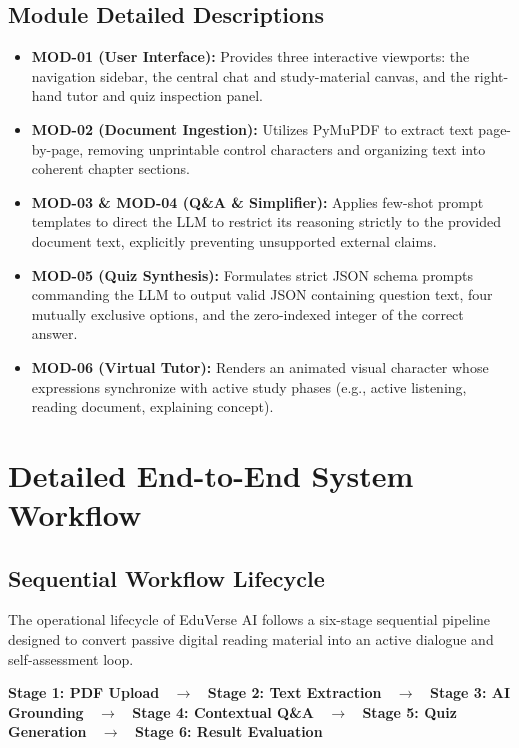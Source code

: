 \documentclass[11pt,a4paper]{report}
\begin{document}
\section{Module Detailed Descriptions}
\begin{itemize}[noitemsep, topsep=2pt]
    \item \textbf{MOD-01 (User Interface):} Provides three interactive viewports: the navigation sidebar, the central chat and study-material canvas, and the right-hand tutor and quiz inspection panel.
    \item \textbf{MOD-02 (Document Ingestion):} Utilizes PyMuPDF to extract text page-by-page, removing unprintable control characters and organizing text into coherent chapter sections.
    \item \textbf{MOD-03 \& MOD-04 (Q\&A \& Simplifier):} Applies few-shot prompt templates to direct the LLM to restrict its reasoning strictly to the provided document text, explicitly preventing unsupported external claims.
    \item \textbf{MOD-05 (Quiz Synthesis):} Formulates strict JSON schema prompts commanding the LLM to output valid JSON containing question text, four mutually exclusive options, and the zero-indexed integer of the correct answer.
    \item \textbf{MOD-06 (Virtual Tutor):} Renders an animated visual character whose expressions synchronize with active study phases (e.g., active listening, reading document, explaining concept).
\end{itemize}
\clearpage

\chapter{Detailed End-to-End System Workflow}
\label{ch:workflow}

\section{Sequential Workflow Lifecycle}
The operational lifecycle of EduVerse AI follows a six-stage sequential pipeline designed to convert passive digital reading material into an active dialogue and self-assessment loop.

\begin{center}
    \begin{mdframed}[linecolor=icemTeal, backgroundcolor=cardBg, innerleftmargin=8pt, innerrightmargin=8pt, innertopmargin=6pt, innerbottommargin=6pt]
        \small\bfseries\color{icemNavy}
        Stage 1: PDF Upload \ $\longrightarrow$ \ 
        Stage 2: Text Extraction \ $\longrightarrow$ \ 
        Stage 3: AI Grounding \ $\longrightarrow$ \ 
        Stage 4: Contextual Q\&A \ $\longrightarrow$ \ 
        Stage 5: Quiz Generation \ $\longrightarrow$ \ 
        Stage 6: Result Evaluation
    \end{mdframed}
\end{center}
\end{document}
